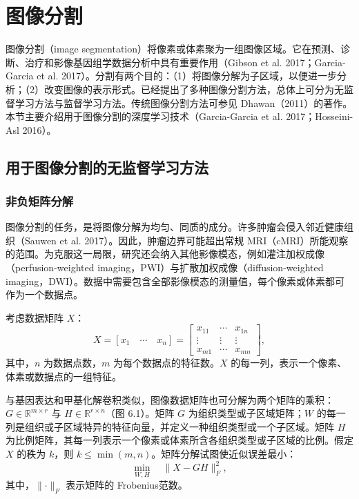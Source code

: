\section{图像分割}

图像分割（image segmentation）将像素或体素聚为一组图像区域。它在预测、诊断、治疗和影像基因组学数据分析中具有重要作用（Gibson et al. 2017；Garcia-Garcia et al. 2017）。分割有两个目的：（1）将图像分解为子区域，以便进一步分析；（2）改变图像的表示形式。已经提出了多种图像分割方法，总体上可分为无监督学习方法与监督学习方法。传统图像分割方法可参见 Dhawan（2011）的著作。本节主要介绍用于图像分割的深度学习技术（Garcia-Garcia et al. 2017；Hosseini-Asl 2016）。

\subsection{用于图像分割的无监督学习方法}
\subsubsection{非负矩阵分解}

图像分割的任务，是将图像分解为均匀、同质的成分。许多肿瘤会侵入邻近健康组织（Sauwen et al. 2017）。因此，肿瘤边界可能超出常规 MRI（cMRI）所能观察的范围。为克服这一局限，研究还会纳入其他影像模态，例如灌注加权成像（perfusion-weighted imaging，PWI）与扩散加权成像（diffusion-weighted imaging，DWI）。数据中需要包含全部影像模态的测量值，每个像素或体素都可作为一个数据点。

考虑数据矩阵 $X$：
\[
X=[x_1\quad\cdots\quad x_n]
=\begin{bmatrix}x_{11}&\cdots&x_{1n}\\\vdots&\vdots&\vdots\\x_{m1}&\cdots&x_{mn}\end{bmatrix},
\]
其中，$n$ 为数据点数，$m$ 为每个数据点的特征数。$X$ 的每一列，表示一个像素、体素或数据点的一组特征。

与基因表达和甲基化解卷积类似，图像数据矩阵也可分解为两个矩阵的乘积：$G\in\mathbb R^{m\times r}$ 与 $H\in\mathbb R^{r\times n}$（图 6.1）。矩阵 $G$ 为组织类型或子区域矩阵；$W$ 的每一列是组织或子区域特异的特征向量，并定义一种组织类型或一个子区域。矩阵 $H$ 为比例矩阵，其每一列表示一个像素或体素所含各组织类型或子区域的比例。假定 $X$ 的秩为 $k$，则 $k\leq\min(m,n)$。矩阵分解试图使近似误差最小：
\begin{equation}
\min_{W,H}\quad\lVert X-GH\rVert_F^2,
\tag{6.1}
\end{equation}
其中，$\lVert\cdot\rVert_F$ 表示矩阵的 Frobenius范数。

